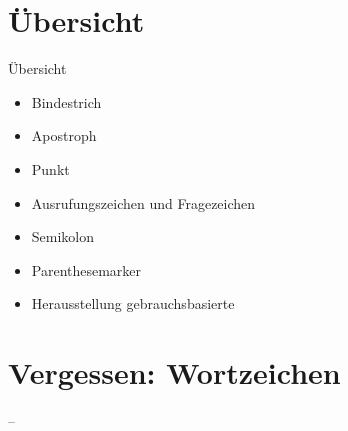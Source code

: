 \section{Übersicht}

\begin{frame}
  {Übersicht}
  \onslide<+->
  \begin{itemize}[<+->]
    \item Bindestrich
    \item Apostroph
    \item Punkt
    \item Ausrufungszeichen und Fragezeichen
    \item Semikolon
      \Zeile
    \item Parenthesemarker
      \Zeile
    \item Herausstellung gebrauchsbasierte
  \end{itemize}
\end{frame}

\section[Wortzeichen]{Vergessen: Wortzeichen}

\begin{frame}
  {--}
  \onslide<+->
  \onslide<+->
  \begin{exe}
    \ex
    \begin{xlist}
    \end{xlist}
    \ex
    \begin{xlist}
    \end{xlist}
    \ex
    \begin{xlist}
    \end{xlist}
    \ex
    \begin{xlist}
    \end{xlist}
    \ex
    \begin{xlist}
    \end{xlist}
  \end{exe}
\end{frame}

